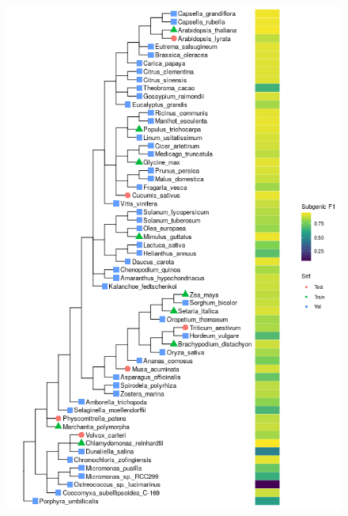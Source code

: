 \documentclass{article}
\begin{document}
\clearpage
\begin{figure}[!h]
\centerline{\includegraphics[width=1.0\textwidth]{images/plants_f1_scores}}
\end{figure}
\end{document}
